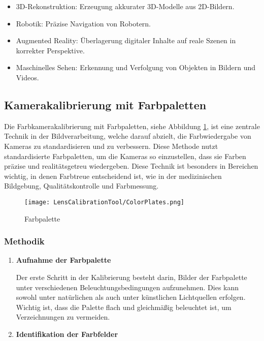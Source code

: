 {    \begin{itemize}
        \item 3D-Rekonstruktion: Erzeugung akkurater 3D-Modelle aus 2D-Bildern.
        \item Robotik: Präzise Navigation von Robotern.
        \item Augmented Reality: Überlagerung digitaler Inhalte auf reale Szenen in korrekter Perspektive.
        \item Maschinelles Sehen: Erkennung und Verfolgung von Objekten in Bildern und Videos.
    \end{itemize}
    

    \subsection{Kamerakalibrierung mit Farbpaletten}
    Die Farbkamerakalibrierung mit Farbpaletten, siehe Abbildung \ref{fig:Farbpalette}, ist eine zentrale Technik in der Bildverarbeitung, welche darauf abzielt, die Farbwiedergabe von Kameras zu standardisieren und zu verbessern. Diese Methode nutzt standardisierte Farbpaletten, um die Kameras so einzustellen, dass sie Farben präzise und realitätsgetreu wiedergeben. Diese Technik ist besonders in Bereichen wichtig, in denen Farbtreue entscheidend ist, wie in der medizinischen Bildgebung, Qualitätskontrolle und Farbmessung.
    
    \begin{figure}
        \centering
        \texttt{[image: LensCalibrationTool/ColorPlates.png]}
        \caption{Farbpalette}
        \label{fig:Farbpalette}
    \end{figure}
    
    \subsubsection{Methodik}
    \begin{enumerate}
        \item \textbf{Aufnahme der Farbpalette}
        
        Der erste Schritt in der Kalibrierung besteht darin, Bilder der Farbpalette unter verschiedenen Beleuchtungsbedingungen aufzunehmen. Dies kann sowohl unter natürlichen als auch unter künstlichen Lichtquellen erfolgen. Wichtig ist, dass die Palette flach und gleichmäßig beleuchtet ist, um Verzeichnungen zu vermeiden.
        \item \textbf{Identifikation der Farbfelder}
        

\end{enumerate}}
